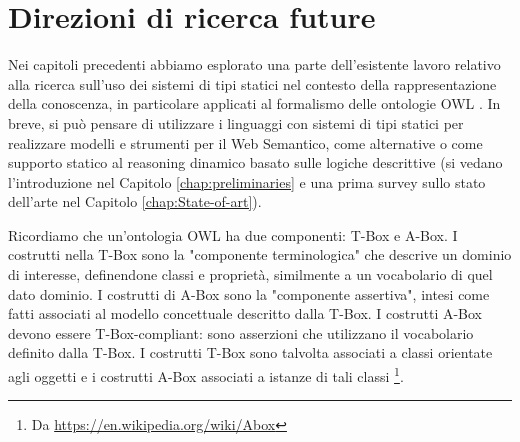 
\chapter[Direzioni di ricerca future]{Direzioni di ricerca future}
\label{chap:FutureWork}

Nei capitoli precedenti abbiamo esplorato una parte dell'esistente lavoro relativo alla ricerca sull'uso dei sistemi di tipi statici nel contesto della 
rappresentazione della conoscenza, in particolare applicati al formalismo delle ontologie OWL \cite{OWL}. In breve, si può pensare di utilizzare i 
linguaggi con sistemi di tipi statici per realizzare modelli e strumenti per  il Web Semantico, come alternative o come supporto statico al reasoning 
dinamico basato sulle logiche descrittive (si vedano l'introduzione nel Capitolo \ref{chap:preliminaries} e una prima survey sullo stato dell'arte nel Capitolo \ref{chap:State-of-art}).

Ricordiamo che un'ontologia OWL ha due componenti: T-Box e A-Box. I costrutti nella T-Box sono la "componente terminologica" che descrive un dominio di 
interesse, definendone classi e proprietà, similmente a un vocabolario di quel dato dominio. I costrutti di A-Box sono la "componente assertiva", 
intesi come fatti associati al modello concettuale descritto dalla T-Box. I costrutti A-Box devono essere T-Box-compliant: sono asserzioni che utilizzano il 
vocabolario definito dalla T-Box. I costrutti T-Box sono talvolta associati a classi orientate agli oggetti e i costrutti A-Box associati a istanze di tali 
classi \footnote{Da \url{https://en.wikipedia.org/wiki/Abox}}.

